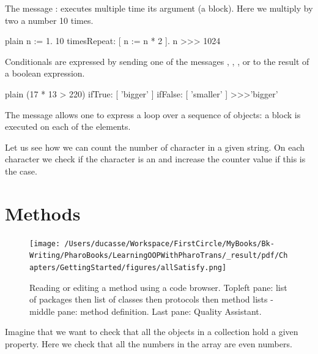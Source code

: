 \documentclass[10pt,twoside,english]{_support/latex/sbabook/sbabook}
\begin{document}
The message : executes multiple time its argument (a block).
Here we multiply by two a number 10 times. 

\begin{displaycode}{plain}
n := 1.
10 timesRepeat: [ n := n * 2 ].
n 
>>> 1024
\end{displaycode}

Conditionals are expressed by sending one of the messages ,
, , or  to the result of a boolean expression.

\begin{displaycode}{plain}
(17 * 13 > 220)
	ifTrue: [ 'bigger' ]
	ifFalse: [ 'smaller' ] 
>>>'bigger'
\end{displaycode}

The message  allows one to express a loop over a sequence of objects: a block is executed on each of the elements. 

Let us see how we can count the number of character  in a given string. On each character we check 
if the character is an  and increase the counter value if this is the case. 

\section{Methods}

\begin{figure}

\begin{center}
\texttt{[image: /Users/ducasse/Workspace/FirstCircle/MyBooks/Bk-Writing/PharoBooks/LearningOOPWithPharoTrans/\_result/pdf/Chapters/GettingStarted/figures/allSatisfy.png]}\caption{Reading or editing a method using a code browser. Topleft pane: list of packages then list of classes then protocols then method lists - middle pane: method definition. Last pane: Quality Assistant.\label{fig:allSatisfy}}\end{center}
\end{figure}


Imagine that we want to check that all the objects in a collection hold a given property.
Here we check that all the numbers in the array are even numbers.
\end{document}

